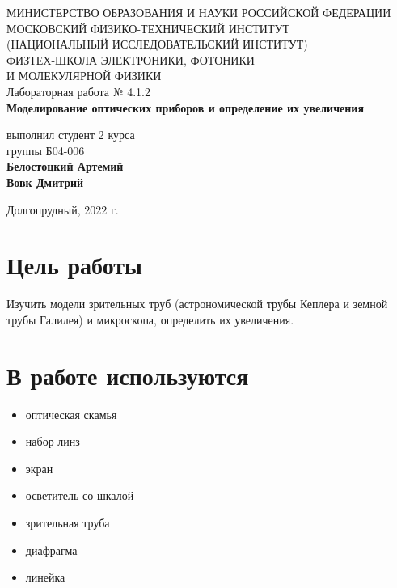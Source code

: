 \documentclass[a4paper,12pt]{article}
\begin{document}
 

\begin{titlepage}
	\begin{center}
		\large 	МИНИСТЕРСТВО ОБРАЗОВАНИЯ И НАУКИ РОССИЙСКОЙ ФЕДЕРАЦИИ\\
				МОСКОВСКИЙ ФИЗИКО-ТЕХНИЧЕСКИЙ ИНСТИТУТ \\
				(НАЦИОНАЛЬНЫЙ ИССЛЕДОВАТЕЛЬСКИЙ ИНСТИТУТ)\\ 
				ФИЗТЕХ-ШКОЛА ЭЛЕКТРОНИКИ, ФОТОНИКИ \\
				И МОЛЕКУЛЯРНОЙ ФИЗИКИ \\
		
		
		\vspace{4.0 cm}
		Лабораторная работа № 4.1.2 \\ 
		\LARGE \textbf{Моделирование оптических приборов и определение их увеличения}
	\end{center}
	\vspace{3 cm} \large
	
	\begin{flushright}
		выполнил студент 2 курса \\
		{группы Б04-006}\\
		\textbf{Белостоцкий Артемий}\\
		\textbf{Вовк Дмитрий}\\
	\end{flushright}
	
	\vfill

	\begin{center}
	Долгопрудный, 2022 г.
	\end{center}
\end{titlepage}                                                                      


\section*{Цель работы}
Изучить модели зрительных труб (астрономической трубы Кеплера и земной трубы Галилея) и микроскопа, определить их увеличения.

\section*{В работе используются}

\begin{itemize}
\item оптическая скамья
\item набор линз
\item экран 
\item осветитель со шкалой
\item зрительная труба 
\item диафрагма 
\item линейка
\end{itemize}
\end{document}
